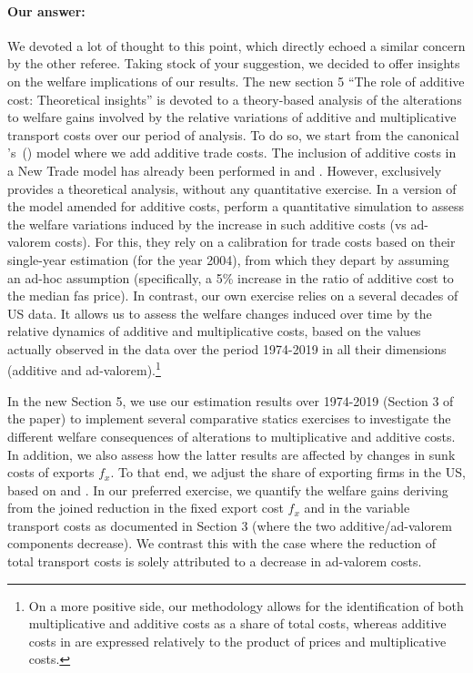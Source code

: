 \documentclass[a4paper,11pt]{article}
\newcommand\cites[1]{\citeauthor{#1}'s\ (\citeyear{#1})}
\begin{document}
\paragraph{Our answer:}
\noindent We devoted a lot of thought to this point, which directly echoed a similar concern by the other referee. Taking stock of your suggestion, we decided to offer insights on the welfare implications of our results. The new section 5 ``The role of additive cost: Theoretical insights'' is devoted to a theory-based analysis of the alterations to welfare gains involved by the relative variations of additive and multiplicative transport costs over our period of analysis. To do so, we start from the canonical \cites{melitz} model where we add additive trade costs. The inclusion of additive costs in a New Trade model has already been performed in \citet{sorensen2014} and \citet{Irrazabal_2015}. However, \citet{sorensen2014} exclusively provides a theoretical analysis, without any quantitative exercise.  In a version of the \citet{chaney2008} model amended for additive costs, \citet{Irrazabal_2015} perform a quantitative simulation to assess the welfare variations induced by the increase in such additive costs (vs ad-valorem costs). For this, they rely on a calibration for trade costs based on their single-year estimation (for the year 2004), from which they depart by assuming an ad-hoc assumption (specifically, a 5\% increase in the ratio of additive cost to the median fas price). In contrast, our own exercise relies on a several decades of US data. It allows us to assess the welfare changes induced over time by the relative dynamics of additive and multiplicative costs, based on the values actually observed in the data over the period 1974-2019 in all their dimensions (additive and ad-valorem).\footnote{On a more positive side, our methodology allows for the identification of both multiplicative and additive costs as a share of total costs, whereas additive costs in \citet{Irrazabal_2015} are expressed relatively to the product of prices and multiplicative costs.}

In the new Section 5, we use our estimation results over 1974-2019 (Section 3 of the paper) to implement several comparative statics exercises to investigate the different welfare consequences of alterations to multiplicative and additive costs. In addition, we also assess how the latter results are affected by changes in sunk costs of exports $f_{x}$. To that end, we adjust the share of exporting firms in the US, based on \citet{BEJK-AER-03} and \citet{Lincoln_McCallum2018}. In our preferred exercise, we quantify the welfare gains deriving from the joined reduction in the fixed export cost $f_x$ and in the variable transport costs as documented in Section 3 (where the two additive/ad-valorem components decrease). We contrast this with the case where the reduction of total transport costs  is solely attributed to a decrease in ad-valorem costs.
\end{document}
